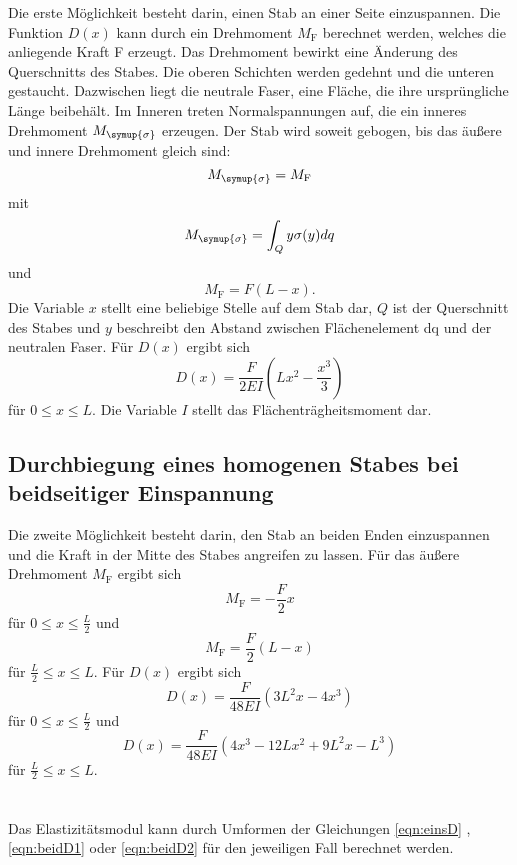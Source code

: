     Die erste Möglichkeit besteht darin, einen Stab an einer Seite einzuspannen.
    Die Funktion $D(x)$ kann durch ein Drehmoment $M_\text{F}$ berechnet werden, welches die anliegende Kraft F erzeugt.
    Das Drehmoment bewirkt eine Änderung des Querschnitts des Stabes. Die oberen Schichten werden gedehnt und die unteren
    gestaucht. Dazwischen liegt die neutrale Faser, eine Fläche, die ihre ursprüngliche Länge beibehält.
    Im Inneren treten Normalspannungen auf, die ein inneres Drehmoment $M_{\symup{\sigma}}$ erzeugen. 
    Der Stab wird soweit gebogen, bis das äußere und innere Drehmoment gleich sind: 
    \begin{equation}
        M_{\symup{\sigma}} = M_\text{F}
    \end{equation}
    mit 
    \begin{equation}
        M_{\symup{\sigma}} = \int_Q y\sigma(y) dq 
    \end{equation}
    und
    \begin{equation}
        M_\text{F} = F (L-x) .
    \end{equation}
    Die Variable $x$ stellt eine beliebige Stelle auf dem Stab dar, $Q$ ist der Querschnitt des Stabes und $y$ beschreibt den 
    Abstand zwischen Flächenelement dq und der neutralen Faser.
    Für $D(x)$ ergibt sich 
    \begin{equation}
        D(x) = \frac{F}{2EI} \left(Lx^2 - \frac{x^3}{3}\right) \label{eqn:einsD}
    \end{equation}
    für $0 \leq x \leq L$. Die Variable $I$ stellt das Flächenträgheitsmoment dar.

\subsection{Durchbiegung eines homogenen Stabes bei beidseitiger Einspannung} \label{sec:beidseitig}

    Die zweite Möglichkeit besteht darin, den Stab an beiden Enden einzuspannen und die Kraft in der 
    Mitte des Stabes angreifen zu lassen.
    Für das äußere Drehmoment $M_\text{F}$ ergibt sich 
    \begin{equation}
        M_\text{F} = - \frac{F}{2} x 
    \end{equation}
    für $0 \leq x \leq \frac{L}{2}$ und
    \begin{equation}
        M_\text{F} = \frac{F}{2} (L-x)
    \end{equation}
    für $\frac{L}{2} \leq x \leq L$.
    Für $D(x)$ ergibt sich 
    \begin{equation}
        D(x) = \frac{F}{48EI} (3L^2 x - 4x^3) \label{eqn:beidD1}
    \end{equation}
    für $0 \leq x \leq \frac{L}{2}$ und 
    \begin{equation}
        D(x) = \frac{F}{48EI} (4x^3 - 12Lx^2 + 9L^2 x - L^3) \label{eqn:beidD2}
    \end{equation}
    für $\frac{L}{2} \leq x \leq L$. \\ \\ \\

Das Elastizitätsmodul kann durch Umformen der Gleichungen \eqref{eqn:einsD} , \eqref{eqn:beidD1} oder \eqref{eqn:beidD2}
für den jeweiligen Fall berechnet werden.